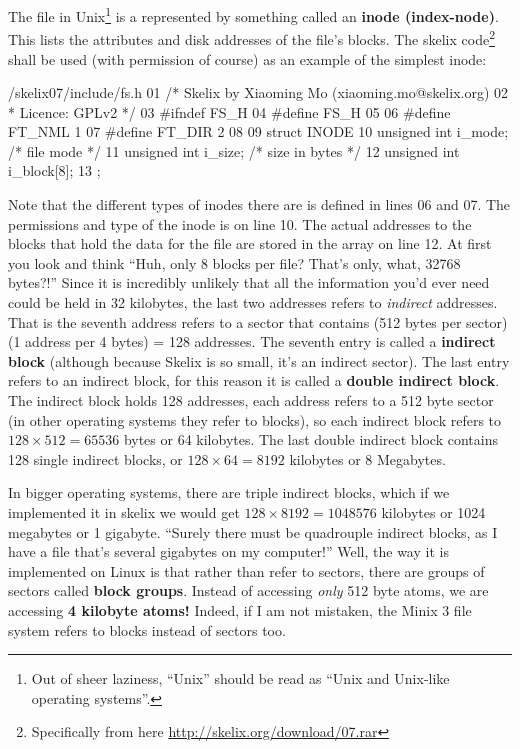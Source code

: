 \documentclass{article}
\begin{document}
The file in Unix\footnote{Out of sheer laziness, ``Unix'' should be read as ``Unix and Unix-like operating systems''.} is a represented by something called an \textbf{inode (index-node)}. This lists the attributes and disk addresses of the file's blocks. The skelix code\footnote{Specifically from here \url{http://skelix.org/download/07.rar}} shall be used (with permission of course) as an example of the simplest inode:
\begin{code}{/skelix07/include/fs.h}
01 /* Skelix by Xiaoming Mo (xiaoming.mo@skelix.org)
02  * Licence: GPLv2 */
03 #ifndef FS_H
04 #define FS_H
05 
06 #define FT_NML    1
07 #define FT_DIR    2
08
09 struct INODE {
10     unsigned int i_mode;        /* file mode */
11     unsigned int i_size;        /* size in bytes */
12     unsigned int i_block[8];
13 };
\end{code}
Note that the different types of inodes there are is defined in lines 06 and 07. The permissions and type of the inode is on line 10. The actual addresses to the blocks that hold the data for the file are stored in the array on line 12. At first you look and think ``Huh, only 8 blocks per file? That's only, what, 32768 bytes?!'' Since it is incredibly unlikely that all the information you'd ever need could be held in 32 kilobytes, the last two addresses refers to \textit{indirect} addresses. That is the seventh address refers to a sector that contains (512 bytes per sector)(1 address per 4 bytes) = 128 addresses. The seventh entry is called a \textbf{indirect block} (although because Skelix is so small, it's an indirect sector). The last entry refers to an indirect block, for this reason it is called a \textbf{double indirect block}. The indirect block holds 128 addresses, each address refers to a 512 byte sector (in other operating systems they refer to blocks), so each indirect block refers to $128\times 512 = 65536$ bytes or 64 kilobytes. The last double indirect block contains 128 single indirect blocks, or $128\times 64 = 8192$ kilobytes or 8 Megabytes.

In bigger operating systems, there are triple indirect blocks, which if we implemented it in skelix we would get $128\times 8192 = 1048576$ kilobytes or 1024 megabytes or 1 gigabyte. ``Surely there must be quadrouple indirect blocks, as I have a file that's several gigabytes on my computer!'' Well, the way it is implemented on Linux is that rather than refer to sectors, there are groups of sectors called \textbf{block groups}. Instead of accessing \textit{only} 512 byte atoms, we are accessing \textbf{4 kilobyte atoms!} Indeed, if I am not mistaken, the Minix 3 file system refers to blocks instead of sectors too.
\end{document}
